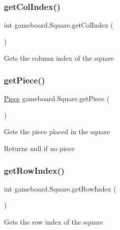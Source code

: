 \subsubsection{\texorpdfstring{get\+Col\+Index()}{getColIndex()}}
{\footnotesize\ttfamily int gameboard.\+Square.\+get\+Col\+Index (\begin{DoxyParamCaption}{ }\end{DoxyParamCaption})}

Gets the column index of the square \mbox{\label{classgameboard_1_1_square_a7c261d1ec58046f8b580efe45e751382}} 
\subsubsection{\texorpdfstring{get\+Piece()}{getPiece()}}
{\footnotesize\ttfamily \mbox{\hyperlink{classpieces_1_1_piece}{Piece}} gameboard.\+Square.\+get\+Piece (\begin{DoxyParamCaption}{ }\end{DoxyParamCaption})}

Gets the piece placed in the square \begin{DoxyReturn}{Returns}
null if no piece 
\end{DoxyReturn}
\mbox{\label{classgameboard_1_1_square_a45ee059f08475d6d83571857f8e8f6ae}} 
\subsubsection{\texorpdfstring{get\+Row\+Index()}{getRowIndex()}}
{\footnotesize\ttfamily int gameboard.\+Square.\+get\+Row\+Index (\begin{DoxyParamCaption}{ }\end{DoxyParamCaption})}

Gets the row index of the square \mbox{\label{classgameboard_1_1_square_a0ad09157aca37441420daf27de6a2f63}} 
